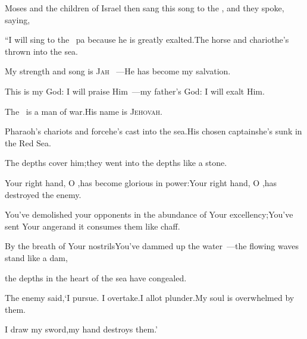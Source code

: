 
\begin{inparaenum}
   Moses and the children of Israel then sang this song to the \lord, and they spoke, saying,\smallskip%
  
  \pb ``I will sing to the \lord\ pa because he is greatly exalted.\pa The horse and chariot\pa he's thrown into the sea.%
  
  \pa {} My strength and song is \textsc{Jah}%
  ~---\pa He has become my%
  salvation.%
  
  \pb This is my God: I will praise Him~---\pa my father's God: I will exalt Him.%
  
  \pa {} The \lord\ is a man%
  of war.\pa His name is \textsc{Jehovah}.%
  
  \pa {} Pharaoh's chariots and force\pa he's cast into the sea.\pa His chosen captains\pa he's sunk in the Red Sea.%
  
  \pa {} The depths cover him;\pa they went into the depths like a stone.%
  
  \pa {} Your right hand, O \lord,\pa has become glorious in power:\pa Your right hand, O \lord,\pa has destroyed the enemy.%
  
  \pa {} You've demolished your opponents in the abundance of Your excellency;\pa You've sent Your anger\pa and it consumes them like chaff.%
  
  \pa {} By the breath of Your nostrils\pa You've dammed up the water~---\pa the flowing waves stand like a dam,%
  
  \pb the depths in the heart of the sea have congealed.%
  
  \pb {} The enemy said,\pa `I pursue. I overtake.\pa I allot plunder.\pa My soul is overwhelmed by them.%
  
  \pb I draw my sword,\pa my hand destroys them.'%
  

\end{inparaenum}
